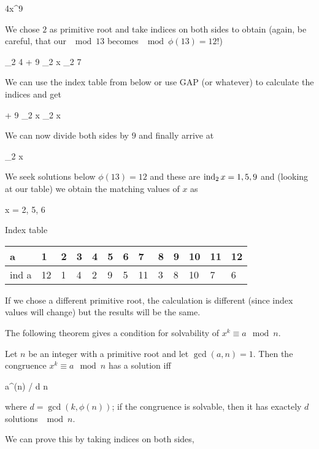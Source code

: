 \bee
4x^9  
\eee

We chose $2$ as primitive root and take indices on both sides to obtain (again, be careful, that our $\mod 13$ becomes $\mod \phi(13) = 12$!)

\bee
\ind_2 4 + 9 \ind_2 x \equiv \ind_2 7 
\eee

We can use the index table from below or use GAP (or whatever) to calculate the indices and get

 + 9 \ind_2 x    \ind_2 x  
\eee

We can now divide both sides by $9$  and finally arrive at

\bee
\ind_2 x   
\eee

We seek solutions below $\phi(13) = 12$ and these are $\operatorname{ind}_2 x = 1, 5, 9$ and (looking at our table) we obtain the matching values of $x$ as

\bee
x = 2, 5, 6 
\eee

Index table

\vspace{2mm}

\begin{tabular}{lllllllllllll}
    a     & 1  & 2 & 3 & 4 & 5 & 6 & 7  & 8 & 9 & 10 & 11 & 12 \\ \hline
    ind a & 12 & 1 & 4 & 2 & 9 & 5 & 11 & 3 & 8 & 10 & 7  & 6 
\end{tabular}

\vspace{2mm}

If we chose a different primitive root, the calculation is different (since index values will change) but the results will be the same.

The following theorem gives a condition for solvability of $x^k \equiv a \mod n$.

\begin{theorem}
Let $n$ be an integer with a primitive root and let $\gcd(a,n) = 1$. Then the congruence $x^k \equiv a \mod n$ has a solution iff

\bee
a^{\phi(n) / d}  \mod n
\eee

where $d = \gcd(k, \phi(n))$; if the congruence is solvable, then it has exactely $d$ solutions $\mod n$.
\end{theorem}

We can prove this by taking indices on both sides,

